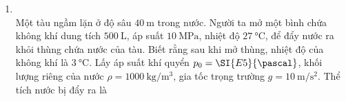 \begin{enumerate}[label=\bfseries Câu \arabic*:, leftmargin=1.7cm]
\item {}\\
Một tàu ngầm lặn ở độ sâu $\SI{40}{\meter}$ trong nước. Người ta mở một bình chứa không khí dung tích $\SI{500}{\liter}$, áp suất $\SI{10}{\mega\pascal}$, nhiệt độ $\SI{27}{\celsius}$, để đẩy nước ra khỏi thùng chứa nước của tàu. Biết rằng sau khi mở thùng, nhiệt độ của không khí là $\SI{3}{\celsius}$. Lấy áp suất khí quyển $p_0=\SI{E5}{\pascal}$, khối lượng riêng của nước $\rho=\SI{1000}{\kilogram/\meter^3}$, gia tốc trọng trường $g=\SI{10}{\meter/\second^2}$. Thể tích nước bị đẩy ra là



\end{enumerate}
